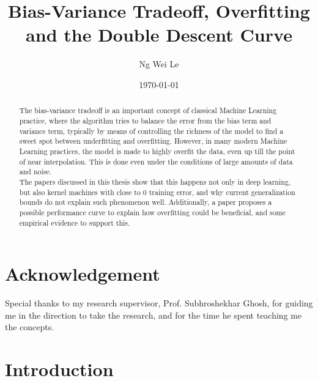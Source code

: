 \documentclass[twoside]{memoir}
\title{Bias-Variance Tradeoff, Overfitting and the Double Descent Curve}
\author{Ng Wei Le}
\date{\today}
\begin{document}
	\frontmatter
	
	
\maketitle

\chapter{Acknowledgement}
Special thanks to my research supervisor, Prof. Subhroshekhar Ghosh, for guiding me in the direction to take the research, and for the time he spent teaching me the concepts.
	
\begin{abstract}
	The bias-variance tradeoff is an important concept of classical Machine Learning practice, where the algorithm tries to balance the error from the bias term and variance term, typically by means of controlling the richness of the model to find a sweet spot between underfitting and overfitting. However, in many modern Machine Learning practices, the model is made to highly overfit the data, even up till the point of near interpolation. This is done even under the conditions of large amounts of data and noise.\\
	The papers discussed in this thesis show that this happens not only in deep learning, but also kernel machines with close to 0 training error, and why current generalization bounds do not explain such phenomenon well. Additionally, a paper proposes a possible performance curve to explain how overfitting could be beneficial, and some empirical evidence to support this.
\end{abstract}
	
\tableofcontents

\listoffigures*

\mainmatter

\chapter{Introduction}
\end{document}
